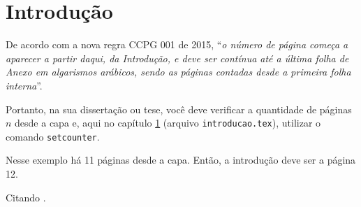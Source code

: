 \chapter{Introdução}
\label{cap:introducao}
\setcounter{page}{12}

De acordo com a nova regra CCPG 001 de 2015, ``\textit{o número de página começa a aparecer a partir daqui, da Introdução, e deve ser contínua até a última folha de Anexo em algarismos arábicos, sendo as páginas contadas desde a primeira folha interna}''.

Portanto, na sua dissertação ou tese, você deve verificar a quantidade de páginas $n$ desde a capa e, aqui no capítulo \ref{cap:introducao} (arquivo \texttt{introducao.tex}), utilizar o comando \texttt{setcounter}.

Nesse exemplo há 11 páginas desde a capa. Então, a introdução deve ser a página 12.

Citando \cite{Parlett1998}.